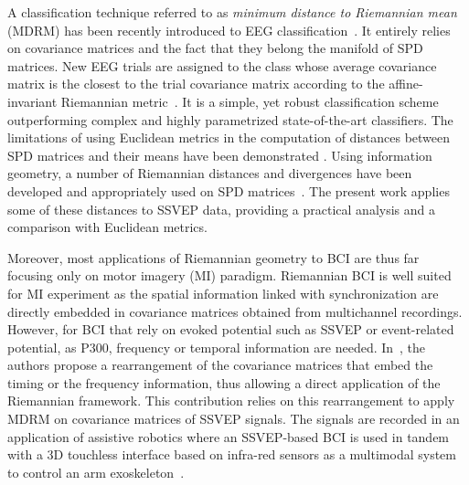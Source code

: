 A classification technique referred to as \emph{minimum distance to Riemannian mean} (MDRM) has been recently introduced to EEG classification~\cite{barachant_multiclass_2012}. 
It entirely relies on covariance matrices and the fact that they belong the manifold of SPD matrices.
New EEG trials are assigned to the class whose average covariance matrix is the closest to the trial covariance matrix according to the affine-invariant Riemannian metric~\cite{moakher_differential_2005}.
It is a simple, yet robust classification scheme outperforming complex and highly parametrized state-of-the-art classifiers. 
The limitations of using Euclidean metrics in the computation of distances between SPD matrices and their means have been demonstrated \cite{arsigny_geometric_2007}. 
Using information geometry, a number of Riemannian distances and divergences have been developed and appropriately used on SPD matrices~\cite{amari_-divergence_2009,arsigny_geometric_2007}. %
The present work applies some of these distances to SSVEP data, providing a practical analysis and a comparison with Euclidean metrics.

Moreover, %
most applications of Riemannian geometry to BCI are thus far focusing only on motor imagery (MI) paradigm.
Riemannian BCI is well suited for MI experiment as the spatial information linked with synchronization are directly embedded in covariance matrices obtained from multichannel recordings.
However, for BCI that rely on evoked potential such as SSVEP or event-related potential, as P300, frequency or temporal information are needed. %
In~\cite{congedo_new_2013}, the authors propose a rearrangement of the covariance matrices that embed the timing or the frequency information, thus allowing a direct application of the Riemannian framework.  
This contribution relies on this rearrangement to apply MDRM on covariance matrices of SSVEP signals.
The signals are recorded in an application of assistive robotics where an SSVEP-based BCI is used in tandem with a 3D touchless interface based on infra-red sensors as a multimodal system to control an arm exoskeleton~\cite{kalunga_hybrid_2014}.

\iflatexml\else {} \fi